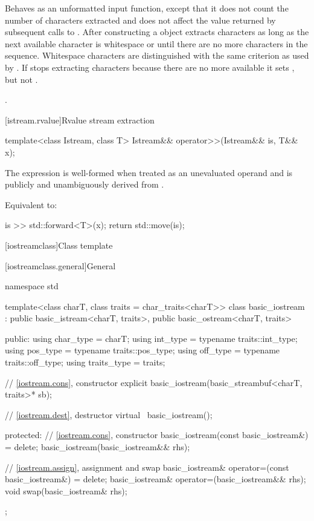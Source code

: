 \begin{itemdescr}
\pnum
\effects
Behaves as an unformatted input function, except that it does not count the number of characters extracted and
does not affect the value returned by subsequent calls to . After
constructing a  object extracts characters as long as the next available
character  is whitespace or until there are no more characters in the sequence.
Whitespace characters are distinguished with the same criterion as used by
.
If
stops extracting characters because there are no more available it sets
,
but not
.

\pnum
\returns
{}.
\end{itemdescr}

[istream.rvalue]{Rvalue stream extraction}

%
\begin{itemdecl}
template<class Istream, class T>
  Istream&& operator>>(Istream&& is, T&& x);
\end{itemdecl}

\begin{itemdescr}
\pnum
\constraints
The expression  is well-formed
when treated as an unevaluated operand and
 is publicly and unambiguously derived from .

\pnum
\effects
Equivalent to:
\begin{codeblock}
is >> std::forward<T>(x);
return std::move(is);
\end{codeblock}
\end{itemdescr}

[iostreamclass]{Class template }

[iostreamclass.general]{General}

%
\begin{codeblock}
namespace std {
  template<class charT, class traits = char_traits<charT>>
  class basic_iostream
    : public basic_istream<charT, traits>,
      public basic_ostream<charT, traits> {
  public:
    using char_type   = charT;
    using int_type    = typename traits::int_type;
    using pos_type    = typename traits::pos_type;
    using off_type    = typename traits::off_type;
    using traits_type = traits;

    // \ref{iostream.cons}, constructor
    explicit basic_iostream(basic_streambuf<charT, traits>* sb);

    // \ref{iostream.dest}, destructor
    virtual ~basic_iostream();

  protected:
    // \ref{iostream.cons}, constructor
    basic_iostream(const basic_iostream&) = delete;
    basic_iostream(basic_iostream&& rhs);

    // \ref{iostream.assign}, assignment and swap
    basic_iostream& operator=(const basic_iostream&) = delete;
    basic_iostream& operator=(basic_iostream&& rhs);
    void swap(basic_iostream& rhs);
  };
}
\end{codeblock}

